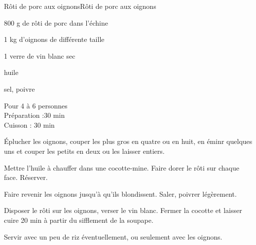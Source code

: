 \begin{recette}{Rôti de porc aux oignons}{Rôti de porc aux oignons}

\begin{ingredients}
800 g de rôti de porc dans l'échine\par
1 kg d'oignons de différente taille\par
1 verre de vin blanc sec\par
huile\par
sel, poivre\par
\end{ingredients}

\begin{infos}
Pour 4 à 6 personnes\\
Préparation :30 min\\
Cuisson : 30 min\\
\end{infos}

\begin{etapes}
\item Éplucher les oignons, couper les plus gros en quatre ou en huit, en éminr quelques uns et couper les petits en deux ou les laisser entiers.
\item Mettre l'huile à chauffer dans une cocotte-mine. Faire dorer le rôti sur chaque face. Réserver.
\item Faire revenir les oignons jusqu'à qu'ils blondissent. Saler, poivrer légèrement.
\item Disposer le rôti sur les oignons, verser le vin blanc. Fermer la cocotte et laisser cuire 20 min à partir du sifflement de la soupape.
\item Servir avec un peu de riz éventuellement, ou seulement avec les oignons.
\end{etapes}

\end{recette}